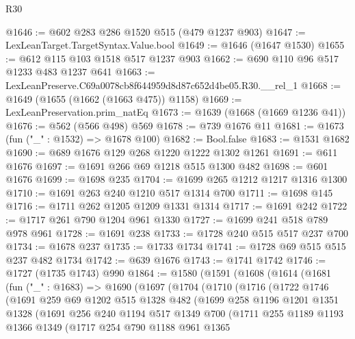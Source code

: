 \begin{lexlean}{R30}
\begin{coremodule}
@1646 := @602 @283 @286 @1520 @515 (@479 @1237 @903)
@1647 := LexLeanTarget.TargetSyntax.Value.bool
@1649 := @1646 (@1647 @1530)
@1655 := @612 @115 @103 @1518 @517 @1237 @903
@1662 := @690 @110 @96 @517 @1233 @483 @1237 @641
@1663 := LexLeanPreserve.C69a0078cb8f644959d8d87c652d4be05.R30.__rel_1
@1668 := @1649 (@1655 (@1662 (@1663 @475)) @1158)
@1669 := LexLeanPreservation.prim_natEq
@1673 := @1639 (@1668 (@1669 @1236 @41))
@1676 := @562 (@566 @498) @569
@1678 := @739 @1676 @11
@1681 := @1673 (fun ("_" : @1532) => @1678 @100)
@1682 := Bool.false
@1683 := @1531 @1682
@1690 := @689 @1676 @129 @268 @1220 @1222 @1302 @1261
@1691 := @611 @1676
@1697 := @1691 @266 @69 @1218 @515 @1300 @482
@1698 := @601 @1676
@1699 := @1698 @235
@1704 := @1699 @265 @1212 @1217 @1316 @1300
@1710 := @1691 @263 @240 @1210 @517 @1314 @700
@1711 := @1698 @145
@1716 := @1711 @262 @1205 @1209 @1331 @1314
@1717 := @1691 @242
@1722 := @1717 @261 @790 @1204 @961 @1330
@1727 := @1699 @241 @518 @789 @978 @961
@1728 := @1691 @238
@1733 := @1728 @240 @515 @517 @237 @700
@1734 := @1678 @237
@1735 := @1733 @1734
@1741 := @1728 @69 @515 @515 @237 @482 @1734
@1742 := @639 @1676
@1743 := @1741 @1742
@1746 := @1727 (@1735 @1743) @990
@1864 := @1580
    (@1591
      (@1608
        (@1614
          (@1681
            (fun ("_" : @1683) =>
            @1690
              (@1697
                (@1704
                  (@1710
                    (@1716
                      (@1722
                        @1746
                        (@1691
                          @259
                          @69
                          @1202
                          @515
                          @1328
                          @482
                          (@1699
                            @258
                            @1196
                            @1201
                            @1351
                            @1328
                            (@1691
                              @256
                              @240
                              @1194
                              @517
                              @1349
                              @700
                              (@1711
                                @255
                                @1189
                                @1193
                                @1366
                                @1349
                                (@1717
                                  @254
                                  @790
                                  @1188
                                  @961
                                  @1365

\end{coremodule}
\end{lexlean}

